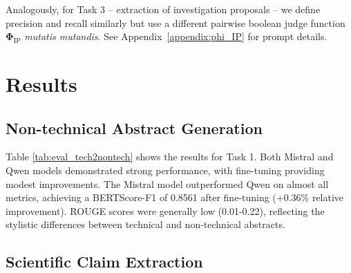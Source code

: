 \documentclass[11pt]{article}
\begin{document}
Analogously, for Task 3 -- extraction of investigation proposals -- we define precision and recall similarly but use a different pairwise boolean judge function $\mathbf{\Phi}_{\textrm{IP}}$ \textit{mutatis mutandis}. See Appendix~\ref{appendix:phi_IP} for prompt details.


\section{Results}

\subsection{Non-technical Abstract Generation}
Table \ref{tab:eval_tech2nontech} shows the results for Task 1. Both Mistral and Qwen models demonstrated strong performance, with fine-tuning providing modest improvements. The Mistral model outperformed Qwen on almost all metrics, achieving a BERTScore-F1 of 0.8561 after fine-tuning (+0.36\% relative improvement). ROUGE scores were generally low (0.01-0.22), reflecting the stylistic differences between technical and non-technical abstracts.


\subsection{Scientific Claim Extraction}
\end{document}
